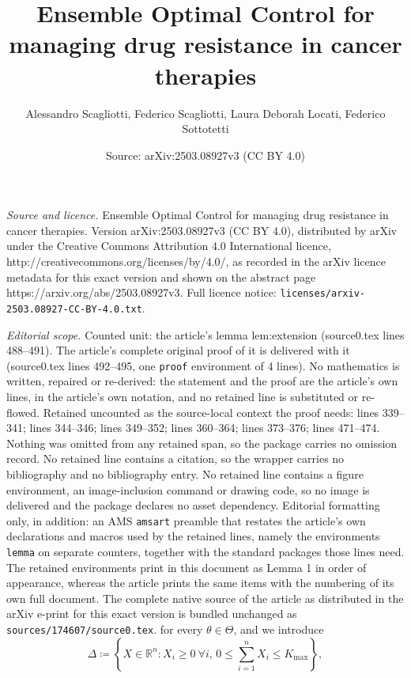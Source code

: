 \documentclass[10pt,a4paper]{amsart}
\title{Ensemble Optimal Control for managing drug resistance in cancer therapies}
\author{Alessandro Scagliotti, Federico Scagliotti, Laura Deborah Locati, Federico Sottotetti}
\date{Source: arXiv:2503.08927v3 (CC BY 4.0)}
\newcommand{\R}{\mathbb{R}}
\begin{document}
\maketitle

\noindent\emph{Source and licence.} Ensemble Optimal Control for managing drug resistance in cancer therapies. Version arXiv:2503.08927v3 (CC BY 4.0), distributed by arXiv under the Creative Commons Attribution 4.0 International licence, http://creativecommons.org/licenses/by/4.0/, as recorded in the arXiv licence metadata for this exact version and shown on the abstract page https://arxiv.org/abs/2503.08927v3. Full licence notice: \texttt{licenses/arxiv-2503.08927-CC-BY-4.0.txt}.\par\smallskip

\noindent\textit{Editorial scope.} Counted unit: the article's lemma lem:extension (source0.tex lines 488--491). The article's complete original proof of it is delivered with it (source0.tex lines 492--495, one \texttt{proof} environment of 4 lines). No mathematics is written, repaired or re-derived: the statement and the proof are the article's own lines, in the article's own notation, and no retained line is substituted or re-flowed.  Retained uncounted as the source-local context the proof needs: lines 339--341; lines 344--346; lines 349--352; lines 360--364; lines 373--376; lines 471--474.  Nothing was omitted from any retained span, so the package carries no omission record.  No retained line contains a citation, so the wrapper carries no bibliography and no bibliography entry.  No retained line contains a figure environment, an image-inclusion command or drawing code, so no image is delivered and the package declares no asset dependency.  Editorial formatting only, in addition: an AMS \texttt{amsart} preamble that restates the article's own declarations and macros used by the retained lines, namely the environments \texttt{lemma} on separate counters, together with the standard packages those lines need.  The retained environments print in this document as Lemma 1 in order of appearance, whereas the article prints the same items with the numbering of its own full document.  The complete native source of the article as distributed in the arXiv e-print for this exact version is bundled unchanged as \texttt{sources/174607/source0.tex}.
for every $\theta \in \Theta$, and we introduce \begin{equation} \label{eq:simplex_start}
     \Delta \coloneqq \left\{ X \in \R^n : X_i \geq 0 \ \forall i, \, 0\leq \sum_{i=1}^n X_i \leq K_{\max} \right\},
\end{equation} 
\end{document}

